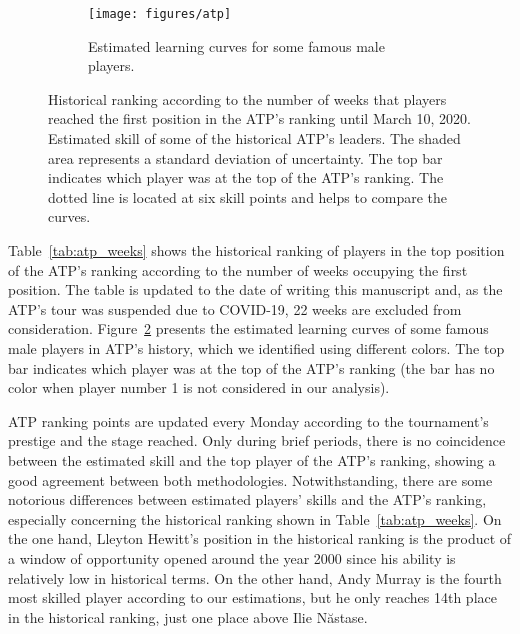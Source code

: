 \documentclass[article]{jss}
\begin{document}
\begin{figure}[ht!]
%
\begin{subfigure}[b]{0.7\linewidth}
    \centering
    \texttt{[image: figures/atp]}
    \caption{Estimated learning curves for some famous male players. }
    \label{fig:atp}
\end{subfigure}
\caption{ Historical ranking according to the number of weeks that players reached the first position in the ATP's ranking until March 10, 2020. 
 Estimated skill of some of the historical ATP's leaders. 
The shaded area represents a standard deviation of uncertainty.  
The top bar indicates which player was at the top of the ATP's ranking. 
The dotted line is located at six skill points and helps to compare the curves. 
}
\end{figure}
%
Table~\ref{tab:atp_weeks} shows the historical ranking of players in the top position of the ATP's ranking according to the number of weeks occupying the first position. 
The table is updated to the date of writing this manuscript and, as the ATP's tour was suspended due to COVID-19, 22 weeks are excluded from consideration. 
Figure~\ref{fig:atp} presents the estimated learning curves of some famous male players in ATP's history, which we identified using different colors. 
The top bar indicates which player was at the top of the ATP's ranking (the bar has no color when player number 1 is not considered in our analysis). 


ATP ranking points are updated every Monday according to the tournament's prestige and the stage reached. 
Only during brief periods, there is no coincidence between the estimated skill and the top player of the ATP's ranking, showing a good agreement between both methodologies. 
Notwithstanding, there are some notorious differences between estimated players' skills and the ATP's ranking, especially concerning the historical ranking shown in Table~\ref{tab:atp_weeks}. 
On the one hand, Lleyton Hewitt's position in the historical ranking is the product of a window of opportunity opened around the year 2000 since his ability is relatively low in historical terms. 
On the other hand, Andy Murray is the fourth most skilled player according to our estimations, but he only reaches 14th place in the historical ranking, just one place above Ilie N\u{a}stase. 

\end{document}
